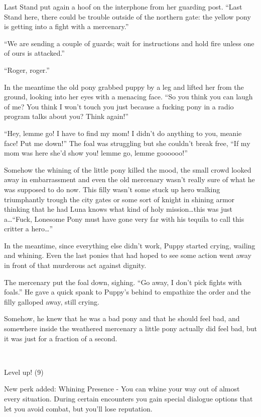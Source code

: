 Last Stand put again a hoof on the interphone from her guarding post. ``Last Stand here, there could be trouble outside of the northern gate: the yellow pony is getting into a fight with a mercenary.''

``We are sending a couple of guards; wait for instructions and hold fire unless one of ours is attacked.''

``Roger, roger.''

In the meantime the old pony grabbed puppy by a leg and lifted her from the ground, looking into her eyes with a menacing face. ``So you think you can laugh of me? You think I won't touch you just because a fucking pony in a radio program talks about you? Think again!''

``Hey, lemme go! I have to find my mom! I didn't do anything to you, meanie face! Put me down!'' The foal was struggling but she couldn't break free, ``If my mom was here she'd show you! lemme go, lemme goooooo!''

Somehow the whining of the little pony killed the mood, the small crowd looked away in embarrassment and even the old mercenary wasn't really sure of what he was supposed to do now. This filly wasn't some stuck up hero walking triumphantly trough the city gates or some sort of knight in shining armor thinking that he had Luna knows what kind of holy mission\dots this was just a\dots ``Fuck, Lonesome Pony must have gone very far with his tequila to call this critter a hero\dots''

In the meantime, since everything else didn't work, Puppy started crying, wailing and whining. Even the last ponies that had hoped to see some action went away in front of that murderous act against dignity.

The mercenary put the foal down, sighing. ``Go away, I don't pick fights with foals.'' He gave a quick spank to Puppy's behind to empathize the order and the filly galloped away, still crying.

Somehow, he knew that he was a bad pony and that he should feel bad, and somewhere inside the weathered mercenary a little pony actually did feel bad, but it was just for a fraction of a second.

~\vfill

\begin{engnote}
    Level up! (9)
    
    New perk added: Whining Presence - You can whine your way out of almost every situation. During certain encounters you gain special dialogue options that let you avoid combat, but you'll lose reputation.
\end{engnote}

